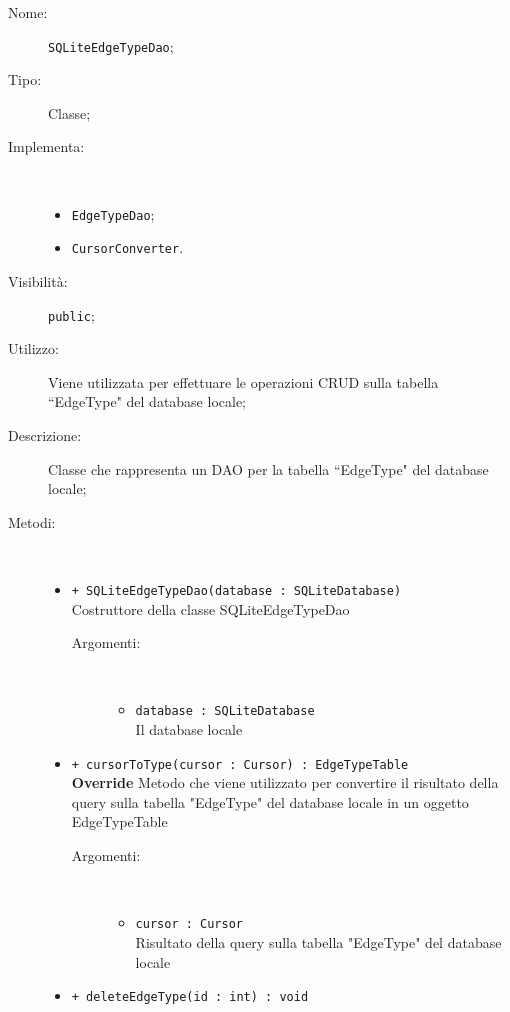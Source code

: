\documentclass[../DefinizioneDiProdotto.tex]{subfiles}
\begin{document}
\begin{description}
	\item[Nome:] \texttt{SQLiteEdgeTypeDao};
	\item[Tipo:] Classe;
	\item[Implementa:] \
	\begin{itemize}
		\item \texttt{EdgeTypeDao};
		
		\item \texttt{CursorConverter}.
		
	\end{itemize}
	\item[Visibilità:] \texttt{public};
	\item[Utilizzo:] Viene utilizzata per effettuare le operazioni CRUD sulla tabella “EdgeType" del database locale;
	\item[Descrizione:] Classe che rappresenta un DAO per la tabella “EdgeType" del database locale;
	\item[Metodi:] \
	\begin{itemize}
		\item \texttt{+ SQLiteEdgeTypeDao(database : SQLiteDatabase)}\\
		Costruttore della classe SQLiteEdgeTypeDao
		\begin{description}
			\item[Argomenti:] \
			\begin{itemize}
				\item \texttt{database : SQLiteDatabase}\\
				Il database locale\end{itemize}
		\end{description}
		\item \texttt{+ cursorToType(cursor : Cursor) : EdgeTypeTable}\\
		\textbf{Override} Metodo che viene utilizzato per convertire il risultato della query sulla tabella "EdgeType" del database locale in un oggetto EdgeTypeTable
		\begin{description}
			\item[Argomenti:] \
			\begin{itemize}
				\item \texttt{cursor : Cursor}\\
				Risultato della query sulla tabella "EdgeType" del database locale\end{itemize}
		\end{description}
		\item \texttt{+ deleteEdgeType(id : int) : void}\\

\end{itemize}
\end{description}
\end{document}
